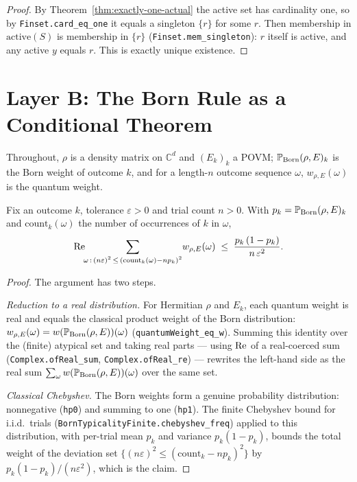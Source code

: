 \begin{proof}
  \leanok
  By Theorem~\ref{thm:exactly-one-actual} the active set has cardinality one, so by
  \texttt{Finset.card\_eq\_one} it equals a singleton $\{r\}$ for some $r$. Then
  membership in $\mathrm{active}(S)$ is membership in $\{r\}$
  (\texttt{Finset.mem\_singleton}): $r$ itself is active, and any active $y$ equals
  $r$. This is exactly unique existence.
\end{proof}


\chapter{Layer B: The Born Rule as a Conditional Theorem}
\label{chap:layerB}

Throughout, $\rho$ is a density matrix on $\mathbb{C}^d$ and $(E_k)_k$ a POVM;
$\mathbb{P}_{\mathrm{Born}}(\rho,E)_k$ is the Born weight of outcome $k$, and for a length-$n$ outcome
sequence $\omega$, $w_{\rho,E}(\omega)$ is the quantum weight.

\begin{theorem}
  \label{thm:quantum-chebyshev}
  \leanok
  Fix an outcome $k$, tolerance $\varepsilon>0$ and trial count $n>0$. With
  $p_k = \mathbb{P}_{\mathrm{Born}}(\rho,E)_k$ and $\mathrm{count}_k(\omega)$ the number of occurrences of
  $k$ in $\omega$,
  \[
    \operatorname{Re} \!\!\sum_{\substack{\omega \,:\, (n\varepsilon)^2 \,\le\,
        (\mathrm{count}_k(\omega) - n p_k)^2}}
    \! w_{\rho,E}(\omega)
    \;\le\; \frac{p_k\,(1-p_k)}{n\,\varepsilon^{2}} .
  \]
\end{theorem}

\begin{proof}
  \leanok
  The argument has two steps.

  \emph{Reduction to a real distribution.} For Hermitian $\rho$ and $E_k$, each
  quantum weight is real and equals the classical product weight of the Born
  distribution: $w_{\rho,E}(\omega) = w(\mathbb{P}_{\mathrm{Born}}(\rho,E))(\omega)$
  (\texttt{quantumWeight\_eq\_w}). Summing this identity over the (finite) atypical set
  and taking real parts --- using $\operatorname{Re}$ of a real-coerced sum
  (\texttt{Complex.ofReal\_sum}, \texttt{Complex.ofReal\_re}) --- rewrites the
  left-hand side as the real sum $\sum_\omega w(\mathbb{P}_{\mathrm{Born}}(\rho,E))(\omega)$ over the same
  set.

  \emph{Classical Chebyshev.} The Born weights form a genuine probability
  distribution: nonnegative (\texttt{hp0}) and summing to one (\texttt{hp1}). The
  finite Chebyshev bound for i.i.d.\ trials
  (\texttt{BornTypicalityFinite.chebyshev\_freq}) applied to this distribution, with
  per-trial mean $p_k$ and variance $p_k(1-p_k)$, bounds the total weight of the
  deviation set $\{(n\varepsilon)^2 \le (\mathrm{count}_k - n p_k)^2\}$ by
  $p_k(1-p_k)/(n\varepsilon^2)$, which is the claim.
\end{proof}

